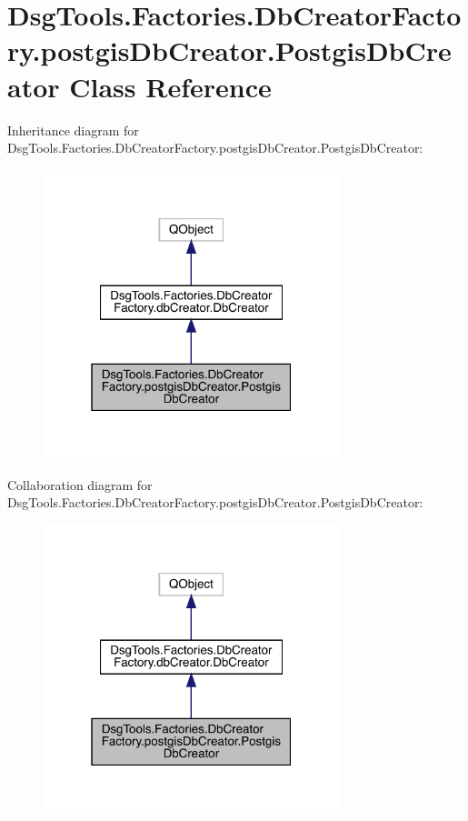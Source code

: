 \hypertarget{class_dsg_tools_1_1_factories_1_1_db_creator_factory_1_1postgis_db_creator_1_1_postgis_db_creator}{}\section{Dsg\+Tools.\+Factories.\+Db\+Creator\+Factory.\+postgis\+Db\+Creator.\+Postgis\+Db\+Creator Class Reference}
\label{class_dsg_tools_1_1_factories_1_1_db_creator_factory_1_1postgis_db_creator_1_1_postgis_db_creator}


Inheritance diagram for Dsg\+Tools.\+Factories.\+Db\+Creator\+Factory.\+postgis\+Db\+Creator.\+Postgis\+Db\+Creator\+:
\nopagebreak
\begin{figure}[H]
\begin{center}
\leavevmode
\includegraphics[width=244pt]{class_dsg_tools_1_1_factories_1_1_db_creator_factory_1_1postgis_db_creator_1_1_postgis_db_creator__inherit__graph}
\end{center}
\end{figure}


Collaboration diagram for Dsg\+Tools.\+Factories.\+Db\+Creator\+Factory.\+postgis\+Db\+Creator.\+Postgis\+Db\+Creator\+:
\nopagebreak
\begin{figure}[H]
\begin{center}
\leavevmode
\includegraphics[width=244pt]{class_dsg_tools_1_1_factories_1_1_db_creator_factory_1_1postgis_db_creator_1_1_postgis_db_creator__coll__graph}
\end{center}
\end{figure}
